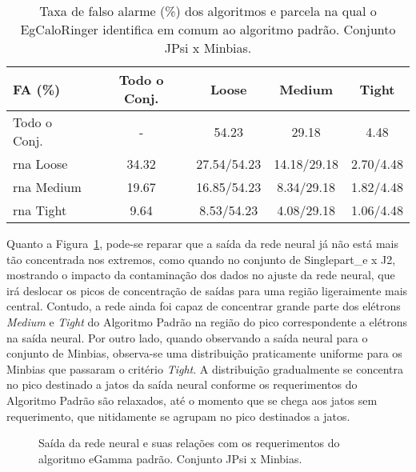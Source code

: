\begin{table}[htb]
\centering
\begin{tabular}{l cccc}
\hline
\hline
FA (\%)& Todo o Conj. & Loose & Medium & Tight \\
\hline
Todo o Conj.    &  -    & 54.23       & 29.18       & 4.48      \\
\gls{rna} Loose & 34.32 & 27.54/54.23 & 14.18/29.18 & 2.70/4.48 \\
\gls{rna} Medium& 19.67 & 16.85/54.23 & 8.34/29.18  & 1.82/4.48 \\
\gls{rna} Tight & 9.64  & 8.53/54.23  & 4.08/29.18  & 1.06/4.48 \\
\hline
\hline
\end{tabular}
\caption{Taxa de falso alarme (\%) dos algoritmos e parcela na qual o EgCaloRinger
identifica em comum ao algoritmo padrão. Conjunto JPsi x Minbias.}
\label{tab:jpsixminb_efic_fa}
\end{table}

Quanto a Figura~\ref{fig:jpsixminb_saidaneural}, pode-se reparar que a saída da
rede neural já não está mais tão concentrada nos extremos, como quando no
conjunto de Singlepart\_e x J2, mostrando o impacto da contaminação dos dados no
ajuste da rede neural, que irá deslocar os picos de concentração de saídas para
uma região ligeraimente mais central. Contudo, a rede ainda foi capaz de
concentrar grande parte dos elétrons \emph{Medium} e \emph{Tight} do Algoritmo
Padrão na região do pico correspondente a elétrons na saída neural. Por outro
lado, quando observando a saída neural para o conjunto de Minbias, observa-se
uma distribuição praticamente uniforme para os Minbias que passaram o critério
\emph{Tight}. A distribuição gradualmente se concentra no pico destinado a jatos
da saída neural conforme os requerimentos do Algoritmo Padrão são relaxados,
até o momento que se chega aos jatos sem requerimento, que nitidamente se agrupam 
no pico destinados a jatos.

\begin{figure}[ht]
\centering
{}
\caption{Saída da rede neural e suas relações com os requerimentos do algoritmo
eGamma padrão. Conjunto JPsi x Minbias.}
\label{fig:jpsixminb_saidaneural}
\end{figure}

